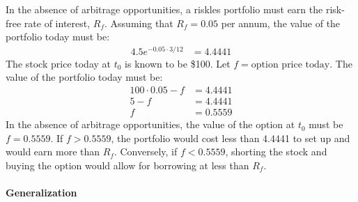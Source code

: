\documentclass[12pt]{article}
\begin{document}
In the absence of arbitrage opportunities, a riskles portfolio must earn the risk-free rate of interest, $R_{f}$. Assuming that $R_{f}=0.05$ per annum, the value of the portfolio today must be:
\begin{align*}
4.5e^{-0.05\cdot3/12}&=4.4441
\end{align*}
The stock price today at $t_{0}$ is known to be \$100. Let $f=\text{option price today}$. The value of the portfolio today must be:
\begin{align*}
100\cdot0.05-f&=4.4441\\
5-f&=4.4441\\
f&=0.5559
\end{align*}
In the absence of arbitrage opportunities, the value of the option at $t_{0}$ must be $f=0.5559$. If $f>0.5559$, the portfolio would cost less than 4.4441 to set up and would earn more than $R_{f}$. Conversely, if $f<0.5559$, shorting the stock and buying the option would allow for borrowing at less than $R_{f}$.

\paragraph{Generalization} \hspace{0pt}
\end{document}
